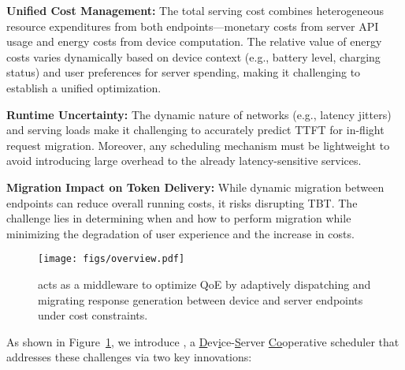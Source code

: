 \begin{denseitemize}
   \item \textbf{Unified Cost Management:} 
   The total serving cost combines heterogeneous resource expenditures from both endpoints---monetary costs from server API usage and energy costs from device computation. The relative value of energy costs varies dynamically based on device context (e.g., battery level, charging status) and user preferences for server spending, making it challenging to establish a unified optimization. 
   
   \item \textbf{Runtime Uncertainty:} 
   The dynamic nature of networks (e.g., latency jitters) and serving loads make it challenging to accurately predict TTFT for in-flight request migration. Moreover, any scheduling mechanism must be lightweight to avoid introducing large overhead to the already latency-sensitive services.
   
   \item \textbf{Migration Impact on Token Delivery:}
   While dynamic migration between endpoints can reduce overall running costs, it risks disrupting TBT. The challenge lies in determining when and how to perform migration while minimizing the degradation of user experience and the increase in costs.
\end{denseitemize}

\begin{figure}[t]
   \centering
   \texttt{[image: figs/overview.pdf]}
   \caption{\disco{} acts as a middleware to optimize QoE by adaptively dispatching and migrating response generation between device and server endpoints under cost constraints. 
   }
   \vspace{-.3cm}
   \label{fig:overview}
\end{figure}

As shown in Figure~\ref{fig:overview}, we introduce \disco{}, a \underline{D}ev\underline{i}ce-\underline{S}erver \underline{Co}operative scheduler that addresses these challenges via two key innovations:

